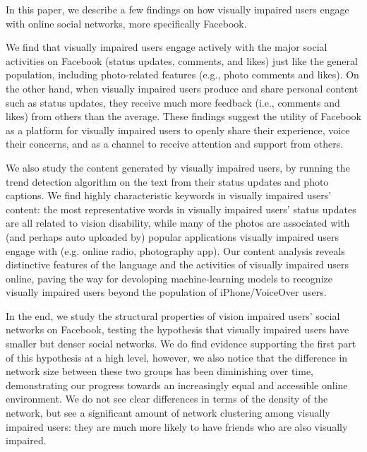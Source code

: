 \documentclass{sigchi}
\begin{document}



In this paper, we describe a few findings on how visually impaired users engage with online social networks, more specifically Facebook. 

We find that visually impaired users engage actively with the major social activities on Facebook (status updates, comments, and likes) just like the general population, including photo-related features (e.g., photo comments and likes). On the other hand, when visually impaired users produce and share personal content such as status updates, they receive much more feedback (i.e., comments and likes) from others than the average. These findings suggest the utility of Facebook as a platform for visually impaired users to openly share their experience, voice their concerns, and as a channel to receive attention and support from others.

We also study the content generated by visually impaired users, by running the trend detection algorithm on the text from their status updates and photo captions. We find highly characteristic keywords in visually impaired users' content: the most representative words in visually impaired users' status updates are all related to vision disability, while many of the photos are associated with (and perhaps auto uploaded by) popular applications  visually impaired users engage with (e.g. online radio, photography app). Our content analysis reveals distinctive features of the language and the activities of visually impaired users online, paving the way for devoloping machine-learning models to recognize visually impaired users beyond the population of iPhone/VoiceOver users. 

In the end, we study the structural properties of vision impaired users' social networks on Facebook, testing the hypothesis that  visually impaired users have smaller but denser social networks. We do find evidence supporting the first part of this hypothesis at a high level, however, we also notice that the difference in network size between these two groups has been diminishing over time, demonstrating our progress towards an increasingly equal and accessible online environment. We do not see clear differences in terms of the density of the network, but see a significant amount of network clustering among visually impaired users: they are much more likely to have friends who are also visually impaired. 
\end{document}
